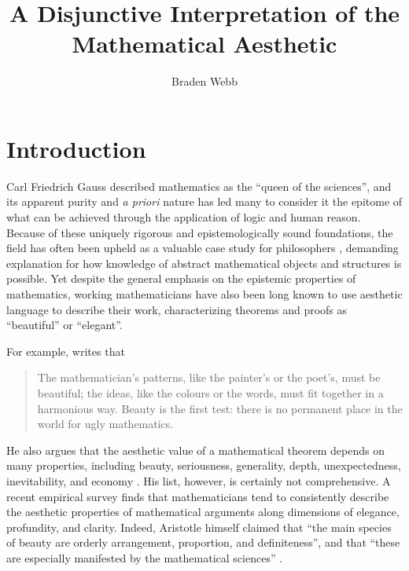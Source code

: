 \documentclass[a4paper,man,natbib]{apa6}
\title{A Disjunctive Interpretation of the Mathematical Aesthetic}
\author{Braden Webb}
\affiliation{Department of Philosophy, Brigham Young University\\
PHIL 495R: Directed Readings in the Philosophy of Mathematics\\
Dr. Derek Haderlie\\
22 April 2023}
\begin{document}
\maketitle

\section{Introduction}
Carl Friedrich Gauss described mathematics as the ``queen of the sciences'', and its apparent purity and 
\textit{a priori} nature has led many to consider it the epitome of what can be achieved through
the application of logic and human reason. Because of these uniquely rigorous and epistemologically sound
foundations, the field has often been upheld as a valuable case study for philosophers \citep{shapiro_thinking_2000},
demanding explanation for how knowledge of abstract mathematical objects and structures is possible. 
Yet despite the general emphasis on the epistemic properties of mathematics, working mathematicians have 
also been long known to use aesthetic language to describe their work, characterizing theorems and proofs as
``beautiful'' or ``elegant''. 

For example, \cite{hardy_mathematicians_1940} writes that
\begin{quotation}
      The mathematician’s patterns, like the painter’s or the poet’s, must be beautiful; the ideas, like the 
      colours or the words, must fit together in a harmonious way. Beauty is the first test: there is no 
      permanent place in the world for ugly mathematics.
\end{quotation}
He also argues that the aesthetic value of a mathematical theorem depends on many properties, including
beauty, seriousness, generality, depth, unexpectedness, inevitability, and 
economy \citep{hardy_mathematicians_1940}. His list, however, is certainly not comprehensive. A recent empirical survey
\citep{johnson_intuitions_2019} finds that mathematicians tend to consistently describe the aesthetic properties of 
mathematical arguments along dimensions of elegance, profundity, and clarity. Indeed, Aristotle himself 
claimed that ``the main species of beauty are orderly arrangement, proportion, and definiteness'', 
and that ``these are especially manifested by the mathematical sciences''
\cite[VIII, 1078a]{aristotle_metaphysics_nodate}.
\end{document}
